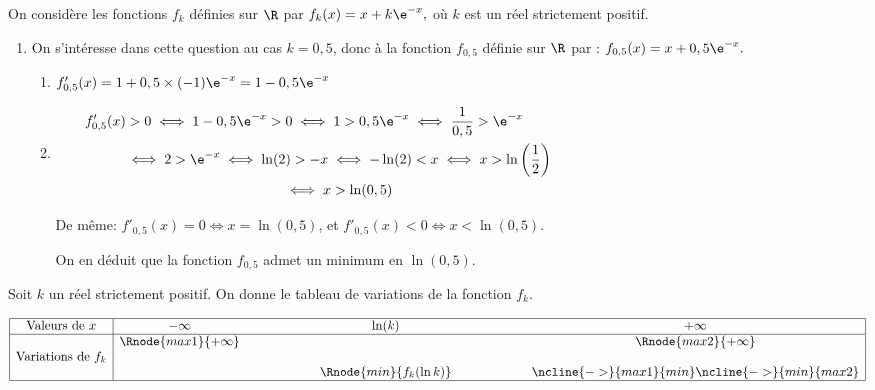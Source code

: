 On considère les fonctions $f_{k}$ définies sur $\R$ par 
$f_{k}(x) = x + k \e^{-x},$
 où $k$ est un réel strictement positif.

	\begin{enumerate}
		\item On s'intéresse dans cette question au cas $k = 0,5$, donc à la fonction $f_{0,5}$ définie sur $\R$ par : $f_{0,5}(x) = x + 0,5 \e^{-x}.$

\smallskip
	\begin{enumerate}
		\item 
$f'_{0,5}(x)=1+0,5\times(-1)\e^{-x}=1-0,5\e^{-x}$		
		
		\item 
$\begin{gathered}f'_{0,5}(x) >0
\iff
1-0,5\e^{-x} >0
\iff
1>0,5\e^{-x}
\iff
\dfrac{1}{0,5}>\e^{-x}\\
\phantom{f'_{0,5}(x) >0}
\iff
2>\e^{-x}
\iff
\ln(2)>-x
\iff
-\ln(2)<x
\iff
x>\ln\left (\dfrac{1}{2}\right )\\
\phantom{f'_{0,5}(x) >0}
\iff
x>\ln(0,5)\end{gathered}$

De même: $f'_{0,5}(x)=0 \iff x=\ln(0,5)$, et $f'_{0,5}(x)<0 \iff x<\ln(0,5)$.

On en déduit que la fonction $f_{0,5}$ admet un minimum en $\ln(0,5)$.
	\end{enumerate}
\end{enumerate}

Soit $k$ un réel strictement positif. On donne le tableau de variations de la fonction $f_{k}$.
\medskip

\begin{center}
{\renewcommand{\arraystretch}{1.3}
\def\esp{\hspace*{1.5cm}}
\def\hauteur{0pt}
$\begin{array}{|c| *4{c} c|}
\hline
 \text{Valeurs de } x & -\infty & \esp & \ln(k) & \esp & +\infty \\
\hline
  & \Rnode{max1}{+\infty}  &  &  &  & \Rnode{max2}{+\infty}   \\
\text{Variations de } f_k & &  & & &  \rule{0pt}{\hauteur} \\
 &  & &   \Rnode{min}{f_k(\ln k)} & & \rule{0pt}{\hauteur}
\ncline{->}{max1}{min} \ncline{->}{min}{max2}\\
\hline
\end{array}$
\renewcommand{\arraystretch}{1}}
\end{center}

